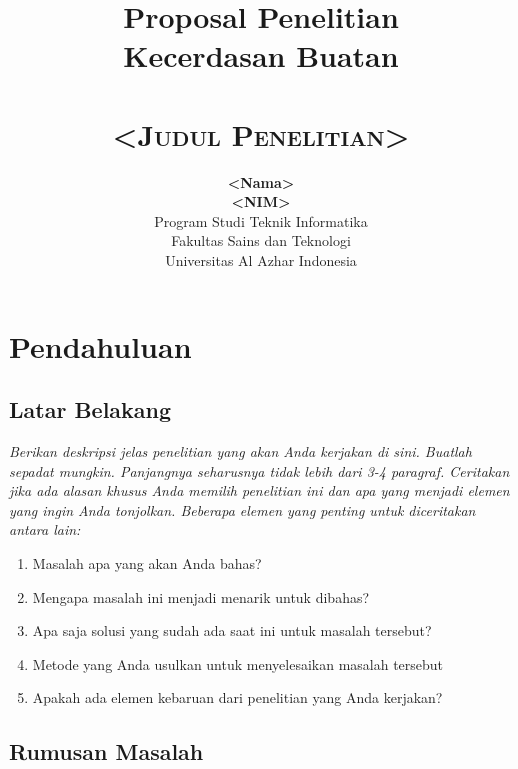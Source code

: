 \documentclass[12pt]{report}
\begin{document}
\nocite{*}

\title{Proposal Penelitian \\
Kecerdasan Buatan \\~\\
\textsc{<Judul Penelitian>}}

\author{\textbf{<Nama>} \\
\textbf{<NIM>} \\
Program Studi Teknik Informatika \\
Fakultas Sains dan Teknologi \\
Universitas Al Azhar Indonesia}

\date{\the\year}

\maketitle

\chapter{Pendahuluan}

\section{Latar Belakang} %
\label{sec:latar_belakang}

\emph{Berikan deskripsi jelas penelitian yang akan Anda kerjakan di sini. Buatlah sepadat mungkin. Panjangnya seharusnya tidak lebih dari 3-4 paragraf. Ceritakan jika ada alasan khusus Anda memilih penelitian ini dan apa yang menjadi elemen yang ingin Anda tonjolkan. Beberapa elemen yang penting untuk diceritakan antara lain:}
\begin{enumerate}
    \item Masalah apa yang akan Anda bahas?
    \item Mengapa masalah ini menjadi menarik untuk dibahas?
    \item Apa saja solusi yang sudah ada saat ini untuk masalah tersebut?
    \item Metode yang Anda usulkan untuk menyelesaikan masalah tersebut
    \item Apakah ada elemen kebaruan dari penelitian yang Anda kerjakan?
\end{enumerate}


\section{Rumusan Masalah} %
\label{sec:rumusan_masalah}
\end{document}

